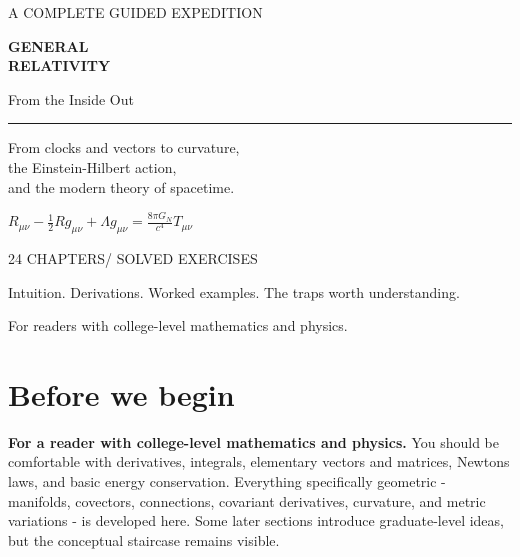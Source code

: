 \documentclass[
  11pt,
  letterpaper,
  oneside,
  openany]{scrbook}
\author{}
\date{}
\begin{document}
\frontmatter

\begin{titlepage}
\thispagestyle{empty}
\vspace*{0.7in}
{\sffamily\fontsize{11}{14}\selectfont\color{accent}A COMPLETE GUIDED EXPEDITION\par}
\vspace{0.35in}
{\sffamily\bfseries\fontsize{38}{43}\selectfont\color{ink}GENERAL\\RELATIVITY\par}
\vspace{0.22in}
{\sffamily\fontsize{23}{29}\selectfont\color{ink}From the Inside Out\par}
\vspace{0.32in}
{\color{accent}\rule{1.05in}{2pt}\par}
\vspace{0.3in}
{\fontsize{14}{20}\selectfont From clocks and vectors to curvature,\\the Einstein-Hilbert action,\\and the modern theory of spacetime.\par}
\vspace{0.55in}
\begin{center}
{\large\color{ink}$\displaystyle R_{\mu\nu}-\frac12 Rg_{\mu\nu}+\Lambda g_{\mu\nu}=\frac{8\pi G_N}{c^4}T_{\mu\nu}$}
\end{center}
\vfill
{\sffamily\fontsize{10}{15}\selectfont\color{muted}24 CHAPTERS\quad / SOLVED EXERCISES\par}
\vspace{0.12in}
{\small Intuition. Derivations. Worked examples. The traps worth understanding.\par}
\vspace{0.2in}
{\small\color{muted}For readers with college-level mathematics and physics.\par}
\end{titlepage}
\frontmatter
\setcounter{tocdepth}{0}
{\small{}\tableofcontents}
\clearpage

\hypertarget{before-we-begin}{%
\chapter{Before we begin}\label{before-we-begin}}

\textbf{For a reader with college-level mathematics and physics.} You
should be comfortable with derivatives, integrals, elementary vectors
and matrices, Newton\textquotesingle s laws, and basic energy
conservation. Everything specifically geometric - manifolds, covectors,
connections, covariant derivatives, curvature, and metric variations -
is developed here. Some later sections introduce graduate-level ideas,
but the conceptual staircase remains visible.
\end{document}
